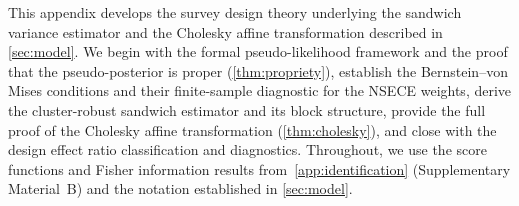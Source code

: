 
This appendix develops the survey design theory underlying the sandwich
variance estimator and the Cholesky affine transformation described in
\cref{sec:model}. We begin with the formal pseudo-likelihood framework
and the proof that the pseudo-posterior is proper
(\cref{thm:propriety}), establish the Bernstein--von Mises conditions
and their finite-sample diagnostic for the NSECE weights, derive the
cluster-robust sandwich estimator and its block structure, provide the
full proof of the Cholesky affine transformation
(\cref{thm:cholesky}), and close with the design effect ratio
classification and diagnostics. Throughout, we use the score functions
and Fisher information results from~\cref{app:identification}
(Supplementary Material~B) and the notation established in
\cref{sec:model}.












